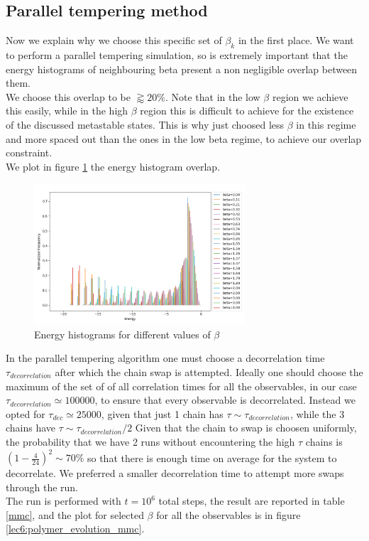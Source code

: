 \subsection{Parallel tempering method}
Now we explain why we choose this specific set of $\beta_k$ in the first place. We want to perform a parallel tempering simulation, so is 
extremely important that the energy histograms of neighbouring beta present a non negligible overlap \cite{Marinari-1992} between them. \\
We choose this overlap to be $\gtrapprox 20 \%$. Note that in the low $\beta$ region we achieve this easily, while in the high $\beta$ region 
this is difficult to achieve for the existence of the discussed metastable states. This is why just choosed less $\beta$ in this regime and more 
spaced out than the ones in the low beta regime, to achieve our overlap constraint. \\
We plot in figure \ref{lec6:energy_hist} the energy histogram overlap. \\

\begin{figure}[H]
    \centering
    \includegraphics[width=0.7\textwidth]{FIG/exercise_6_images/energy_histogram.png}
    \caption{Energy histograms for different values of $\beta$}
    \label{lec6:energy_hist}
\end{figure}

In the parallel tempering algorithm one must choose a decorrelation time $\tau_{decorrelation}$ after which the chain swap is attempted.
Ideally one should choose the maximum of the set of of all correlation times for all the observables, in our case $\tau_{decorrelation} \simeq 100000$, to ensure that 
every observable is decorrelated. Instead we opted for $\tau_{dec} \simeq 25000$, given that just 1 chain has $\tau \sim \tau_{decorrelation}$, while the 3 chains have $\tau \sim \tau_{decorrelation}/2$ 
Given that the chain to swap is choosen uniformly, the probability that we have 2 runs without encountering the high $\tau$ chains is $\left(1-\frac{4}{24}\right)^2 \sim 70 \% $ 
so that there is enough time on average for the system to decorrelate.
We preferred a smaller decorrelation time to attempt more swaps through the run. \\
The run is performed with $t = 10^6$ total steps, the result are reported in table \ref{mmc}, and the plot for selected $\beta$ for all the observables is in figure \ref{lec6:polymer_evolution_mmc}. \\

